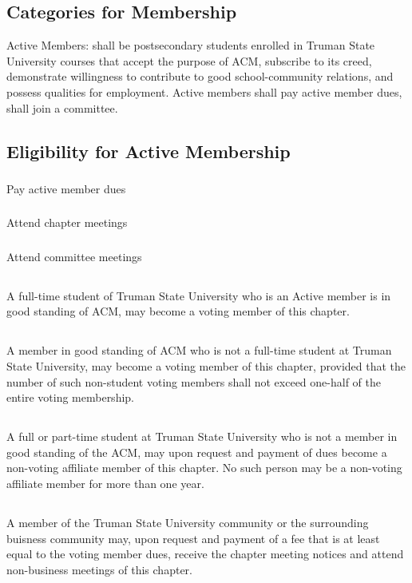 \documentclass[12pt]{article}
\begin{document}
\subsection{Categories for Membership}
	Active Members: shall be postsecondary students enrolled in Truman State University courses that accept the purpose of ACM, subscribe to its creed, demonstrate willingness to contribute to good school-community relations, and possess qualities for employment. Active members shall pay active member dues, shall join a committee.
\subsection{Eligibility for Active Membership}
\subsubsection{}	Pay active member dues
\subsubsection{}	Attend chapter meetings
\subsubsection{}	Attend committee meetings
\subsection{}	A full-time student of Truman State University who is an Active member is in good standing of ACM, may become a voting member of this chapter.
\subsection{}	A member in good standing of ACM who is not a full-time student at Truman State University, may become a voting member of this chapter, provided that the number of such non-student voting members shall not exceed one-half of the entire voting membership.
\subsection{}	A full or part-time student at Truman State University who is not a member in good standing of the ACM, may upon request and payment of dues become a non-voting affiliate member of this chapter. No such person may be a non-voting affiliate member for more than one year.
\subsection{}	A member of the Truman State University community or the surrounding buisness community may, upon request and payment of a fee that is at least equal to the voting member dues, receive the chapter meeting notices and attend non-business meetings of this chapter.
\end{document}

